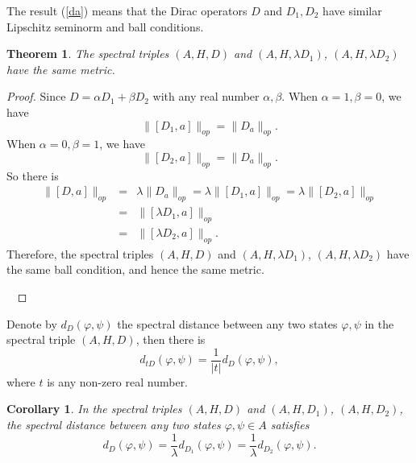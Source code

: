 \documentclass[a4paper,11pt]{article}
\newtheorem{corollary}{Corollary}
\newtheorem{theorem}{Theorem}
\begin{document}
The result (\ref{da}) means that the Dirac operators $D$ and $D_1, D_2$ have similar Lipschitz seminorm and ball conditions.

\begin{theorem}
  The spectral triples $(A, H, D)$ and $(A, H, \lambda D_1)$, $(A, H, \lambda
  D_2)$ have the same metric.
\end{theorem}

\begin{proof}
  Since $D = \alpha D_1 + \beta D_2$ with any real number $\alpha, \beta$.
  When $\alpha = 1, \beta = 0$, we have
  \begin{equation}
    \|[D_1, a]\|_{op} = \|D_a \|_{op}.
  \end{equation}
  When $\alpha = 0, \beta = 1$, we have
  \begin{equation}
    \|[D_2, a]\|_{op} = \|D_a \|_{op} .
  \end{equation}
  So there is
  \begin{eqnarray}
    \|[D, a]\|_{op} & = & \lambda \|D_a \|_{op} = \lambda \|[D_1, a]\|_{op} =
    \lambda \|[D_2, a]\|_{op}\nonumber\\
    & = & \|[\lambda D_1, a]\|_{op}\nonumber\\
    & = & \|[\lambda D_2, a]\|_{op} .
  \end{eqnarray}
  Therefore, the spectral triples $(A, H, D)$ and $(A, H, \lambda D_1)$, $(A,
  H, \lambda D_2)$ have the same ball condition, and hence the same metric.
  
  \ 
\end{proof}

 Denote by $d_D  (\varphi, \psi)$ the spectral distance between any two
  states $\varphi, \psi$ in the spectral triple $(A, H, D)$, then there is\cite{wly}
  \begin{equation}\label{td}
    d_{tD}  (\varphi, \psi) = \frac{1}{|t|} d_D  (\varphi, \psi),
  \end{equation}
  where $t$ is any non-zero real number.

\begin{corollary}
  In the spectral triples $(A, H, D)$ and $(A, H, D_1)$, $(A, H, D_2)$, the
  spectral distance between any two states $\varphi, \psi \in A$ satisfies
  \begin{equation}\label{dd12}
    d_D  (\varphi, \psi) = \frac{1}{\lambda} d_{D_1}  (\varphi, \psi) =
    \frac{1}{\lambda} d_{D_2}  (\varphi, \psi) .
  \end{equation}
\end{corollary}
\end{document}
